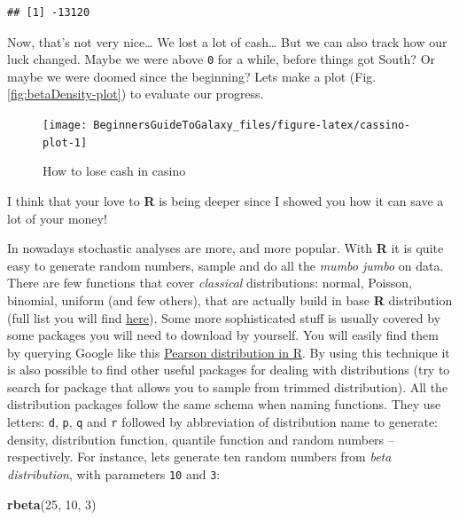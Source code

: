 \documentclass[]{book}
\newenvironment{Shaded}{\begin{snugshade}}{\end{snugshade}}
\newcommand{\KeywordTok}[1]{\textcolor[rgb]{0.13,0.29,0.53}{\textbf{#1}}}
\newcommand{\DecValTok}[1]{\textcolor[rgb]{0.00,0.00,0.81}{#1}}
\newcommand{\NormalTok}[1]{#1}
\theoremstyle{definition}
\theoremstyle{definition}
\theoremstyle{definition}
\theoremstyle{remark}
\begin{document}
\begin{verbatim}
## [1] -13120
\end{verbatim}

Now, that's not very nice\ldots{} We lost a lot of cash\ldots{} But we
can also track how our luck changed. Maybe we were above \texttt{0} for
a while, before things got South? Or maybe we were doomed since the
beginning? Lets make a plot (Fig. \ref{fig:betaDensity-plot}) to
evaluate our progress.

\begin{figure}

{\centering \texttt{[image: BeginnersGuideToGalaxy\_files/figure-latex/cassino-plot-1]} 

}

\caption{How to lose cash in casino}\label{fig:cassino-plot}
\end{figure}

I think that your love to \textbf{R} is being deeper since I showed you
how it can save a lot of your money!

In nowadays stochastic analyses are more, and more popular. With
\textbf{R} it is quite easy to generate random numbers, sample and do
all the \emph{mumbo jumbo} on data. There are few functions that cover
\emph{classical} distributions: normal, Poisson, binomial, uniform (and
few others), that are actually build in base \textbf{R} distribution
(full list you will find
\href{https://stat.ethz.ch/R-manual/R-devel/library/stats/html/Distributions.html}{here}).
Some more sophisticated stuff is usually covered by some packages you
will need to download by yourself. You will easily find them by querying
Google like this
\href{https://www.google.com/search?client=ubuntu\&channel=fs\&q=Pearson+distribution+in+R\&ie=utf-8\&oe=utf-8\&gfe_rd=cr\&dcr=0\&ei=KTI5Ws_7LfPBXrSBr7gO}{Pearson
distribution in R}. By using this technique it is also possible to find
other useful packages for dealing with distributions (try to search for
package that allows you to sample from trimmed distribution). All the
distribution packages follow the same schema when naming functions. They
use letters: \texttt{d}, \texttt{p}, \texttt{q} and \texttt{r} followed
by abbreviation of distribution name to generate: density, distribution
function, quantile function and random numbers -- respectively. For
instance, lets generate ten random numbers from \emph{beta
distribution}, with parameters \texttt{10} and \texttt{3}:

\begin{Shaded}
\begin{Highlighting}[]
\KeywordTok{rbeta}\NormalTok{(}\DecValTok{25}\NormalTok{, }\DecValTok{10}\NormalTok{, }\DecValTok{3}\NormalTok{)}
\end{Highlighting}
\end{Shaded}
\end{document}
